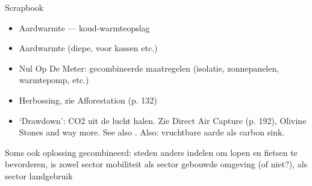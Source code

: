 


Scrapbook
\begin{itemize}
	\item{Aardwarmte –-- koud-warmteopslag}
	\item{Aardwarmte (diepe, voor kassen etc.)}
	\item{Nul Op De Meter: gecombineerde maatregelen (isolatie, zonnepanelen, warmtepomp, etc.)}

	\item{Herbossing, zie Afforestation (p. 132)}
	\item{`Drawdown': CO2 uit de lucht halen. Zie Direct Air Capture (p. 192), Olivine Stones and way more. See also \cite{climate_cleanup_climate_2020}. Also: vruchtbare aarde als carbon sink.}

\end{itemize}

Soms ook oplossing gecombineerd: steden anders indelen om lopen en fietsen te bevorderen, is zowel sector mobiliteit als sector gebouwde omgeving (of niet?), als sector landgebruik
